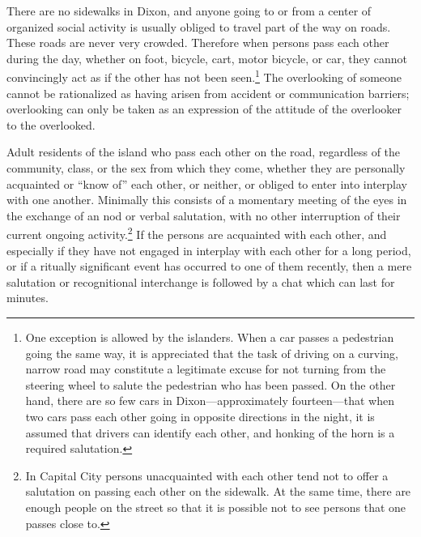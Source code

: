 \documentclass[openany,nobib]{tufte-book}
\begin{document}
There are no sidewalks in Dixon, and anyone going to or from a center of
organized social activity is usually obliged to travel part of the way
on roads. These roads are never very crowded. Therefore when persons
pass each other during the day, whether on foot, bicycle, cart, motor
bicycle, or car, they cannot convincingly act as if the other has not
been seen.\footnote{One exception is allowed by the islanders. When a
  car passes a pedestrian going the same way, it is appreciated that the
  task of driving on a curving, narrow road may constitute a legitimate
  excuse for not turning from the steering wheel to salute the
  pedestrian who has been passed. On the other hand, there are so few
  cars in Dixon---approximately fourteen---that when two cars pass each
  other going in opposite directions in the night, it is assumed that
  drivers can identify each other, and honking of the horn is a required
  salutation.} The overlooking of someone cannot be rationalized as
having arisen from accident or communication barriers; overlooking can
only be taken as an expression of the attitude of the overlooker to the
overlooked.

Adult residents of the island who pass each other on the road,
regardless of the community, class, or the sex from which they come,
whether they are personally acquainted or ``know of'' each other, or
neither, or obliged to enter into interplay with one another. Minimally
this consists of a momentary meeting of the eyes in the exchange of an
nod or verbal salutation, with no other interruption of their current
ongoing activity.\footnote{In Capital City persons unacquainted with
  each other tend not to offer a salutation on passing each other on the
  sidewalk. At the same time, there are enough people on the street so
  that it is possible not to see persons that one passes close to.} If
the persons are acquainted with each other, and especially if they have
not engaged in interplay with each other for a long period, or if a
ritually significant event has occurred to one of them recently, then a
mere salutation or recognitional interchange is followed by a chat which
can last for minutes.
\end{document}
